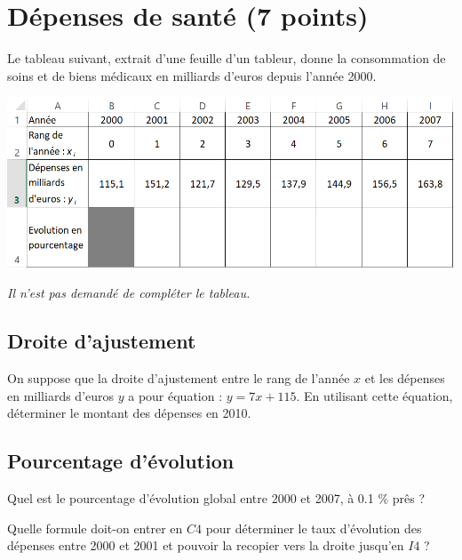 
\section{Dépenses de santé (7 points)}

Le tableau suivant, extrait d'une feuille d'un tableur, donne la consommation de soins et de biens médicaux en milliards d'euros depuis l'année 2000.

\begin{center}
	\includegraphics[scale=0.65]{img/biens_medicaux2}
\end{center}

\emph{Il n'est pas demandé de compléter le tableau.}

\subsection{Droite d'ajustement}

\begin{questions}
	\question[1] On suppose que la droite d'ajustement entre le rang de l'année $x$ et les dépenses en milliards d'euros $y$ a pour équation : $y = 7x + 115$. En utilisant cette équation, déterminer le montant des dépenses en 2010. 

\end{questions}

\subsection{Pourcentage d'évolution}

\begin{questions}
	\question[1] Quel est le pourcentage d'évolution global entre 2000 et 2007, à \num{0.1} \% prês ? 

	\question[1] Quelle formule doit-on entrer en $C4$ pour déterminer le taux d'évolution des dépenses entre 2000 et 2001 et pouvoir la recopier vers la droite jusqu'en $I4$ ?
\end{questions}

